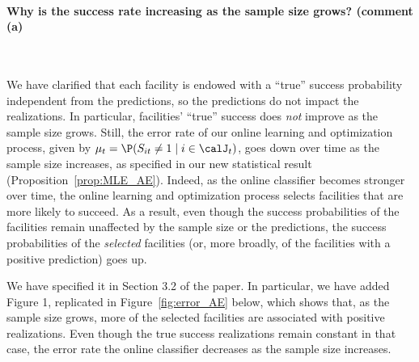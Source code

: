 \documentclass[11pt]{article}
\begin{document}
\paragraph{Why is the success rate increasing as the sample size grows? (comment (a)}\

We have clarified that each facility is endowed with a ``true'' success probability independent from the predictions, so the predictions do not impact the realizations. In particular, facilities' ``true'' success does \textit{not} improve as the sample size grows. Still, the error rate of our online learning and optimization process, given by $\mu_t = \P(S_{it}\neq 1 \mid i\in\calJ_t)$, goes down over time as the sample size increases, as specified in our new statistical result (Proposition~\ref{prop:MLE_AE}). Indeed, as the online classifier becomes stronger over time, the online learning and optimization process selects facilities that are more likely to succeed. As a result, even though the success probabilities of the facilities remain unaffected by the sample size or the predictions, the success probabilities of the \textit{selected} facilities (or, more broadly, of the facilities with a positive prediction) goes up.

We have specified it in Section 3.2 of the paper. In particular, we have added Figure 1, replicated in Figure~\ref{fig:error_AE} below, which shows that, as the sample size grows, more of the selected facilities are associated with positive realizations. Even though the true success realizations remain constant in that case, the error rate the online classifier decreases as the sample size increases.
\end{document}
